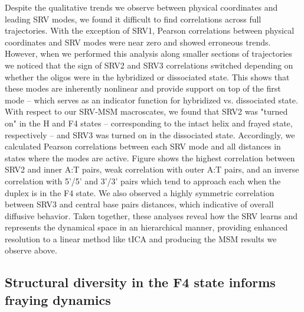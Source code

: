 \documentclass[journal=jpcbfk,manuscript=article]{achemso}
\begin{document}
Despite the qualitative trends we observe between physical coordinates and leading SRV modes, we found it difficult to find correlations across full trajectories. With the exception of SRV1, Pearson correlations between physical coordinates and SRV modes were near zero and showed erroneous trends. However, when we performed this analysis along smaller sections of trajectories we noticed that the sign of SRV2 and SRV3 correlations switched depending on whether the oligos were in the hybridized or dissociated state. This shows that these modes are inherently nonlinear and provide support on top of the first mode -- which serves as an indicator function for hybridized vs. dissociated state. With respect to our SRV-MSM macroscates, we found that SRV2 was "turned on" in the H and F4 states -- corresponding to the intact helix and frayed state, respectively -- and SRV3 was turned on in the dissociated state. Accordingly, we calculated Pearson correlations between each SRV mode and all distances in states where the modes are active. Figure \label{fig:GC-core_tracking_modes} shows the highest correlation between SRV2 and inner A:T pairs, weak correlation with outer A:T pairs, and an inverse correlation with 5'/5' and 3'/3' pairs which tend to approach each when the duplex is in the F4 state. We also observed a highly symmetric correlation between SRV3 and central base pairs distances, which indicative of overall diffusive behavior. Taken together, these analyses reveal how the SRV learns and represents the dynamical space in an hierarchical manner, providing enhanced resolution to a linear method like tICA and producing the MSM results we observe above.

\subsection{Structural diversity in the F4 state informs fraying dynamics} 
\end{document}
